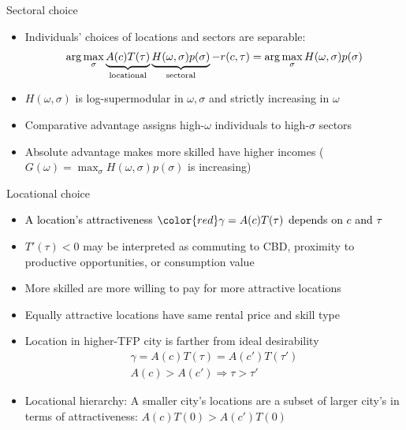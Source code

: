 \documentclass[10pt,notes=hide]{beamer}
\begin{document}
\begin{frame}{Sectoral choice}
\begin{itemize}
\item Individuals' choices of locations and sectors are separable: 
\begin{align*}
\arg\max_{\sigma}\underbrace{A(c)T(\tau)}_{\textnormal{locational}}\underbrace{H(\omega,\sigma)p(\sigma)}_{\textnormal{sectoral}}-r(c,\tau)=\arg\max_{\sigma}H(\omega,\sigma)p(\sigma)
\end{align*}
\item $H(\omega,\sigma)$ is log-supermodular in $\omega,\sigma$ and strictly increasing in $\omega$
\item Comparative advantage assigns high-$\omega$ individuals to high-$\sigma$ sectors
\item Absolute advantage makes more skilled have higher incomes ($G(\omega)=\max_{\sigma}H(\omega,\sigma)p(\sigma)$
is increasing)
\end{itemize}
\end{frame}
\begin{frame}{Locational choice}
\begin{itemize}
\item \textcolor{black}{A location's attractiveness ${\color{red}\gamma}=A(c)T(\tau)$
depends on $c$ and $\tau$}
\item $T'(\tau)<0$ may be interpreted as commuting to CBD, proximity to
productive opportunities, or consumption value
\item More skilled are more willing to pay for more attractive locations
\item Equally attractive locations have same rental price and skill type
\item Location in higher-TFP city is farther from ideal desirability
\begin{align*}
\gamma=A(c)T(\tau)=A(c')T(\tau')\\
A(c)>A(c')\Rightarrow\tau>\tau'
\end{align*}
\item Locational hierarchy: A smaller city's locations are a subset of larger
city's in terms of attractiveness: $A(c)T(0)>A(c')T(0)$ 
\end{itemize}
\end{frame}
\end{document}
